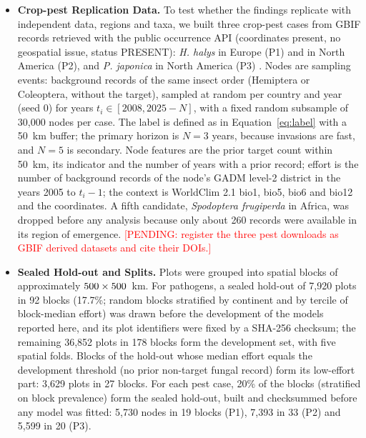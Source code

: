 \documentclass[a4paper,fleqn]{cas-sc}
\newcommand{\pending}[1]{\textcolor{red}{[PENDING: #1]}}
\begin{document}
\begin{itemize}[leftmargin=1.4em]
\item \textbf{Crop-pest Replication Data.} To test whether the findings replicate with independent data, regions and taxa, we built three crop-pest cases from GBIF records retrieved with the public occurrence API (coordinates present, no geospatial issue, status PRESENT): \textit{H. halys} in Europe (P1) and in North America (P2), and \textit{P. japonica} in North America (P3) \citep{leskey2018,althoff2022}. Nodes are sampling events: background records of the same insect order (Hemiptera or Coleoptera, without the target), sampled at random per country and year (seed 0) for years $t_i \in [2008, 2025-N]$, with a fixed random subsample of 30{,}000 nodes per case. The label is defined as in Equation~\eqref{eq:label} with a 50~km buffer; the primary horizon is $N = 3$ years, because invasions are fast, and $N = 5$ is secondary. Node features are the prior target count within 50~km, its indicator and the number of years with a prior record; effort is the number of background records of the node's GADM level-2 district in the years 2005 to $t_i - 1$; the context is WorldClim 2.1 bio1, bio5, bio6 and bio12 \citep{fick2017} and the coordinates. A fifth candidate, \textit{Spodoptera frugiperda} in Africa, was dropped before any analysis because only about 260 records were available in its region of emergence. \pending{register the three pest downloads as GBIF derived datasets and cite their DOIs.}

\item \textbf{Sealed Hold-out and Splits.} Plots were grouped into spatial blocks of approximately $500 \times 500$~km. For pathogens, a sealed hold-out of 7{,}920 plots in 92 blocks (17.7\%; random blocks stratified by continent and by tercile of block-median effort) was drawn before the development of the models reported here, and its plot identifiers were fixed by a SHA-256 checksum; the remaining 36{,}852 plots in 178 blocks form the development set, with five spatial folds. Blocks of the hold-out whose median effort equals the development threshold (no prior non-target fungal record) form its low-effort part: 3{,}629 plots in 27 blocks. For each pest case, 20\% of the blocks (stratified on block prevalence) form the sealed hold-out, built and checksummed before any model was fitted: 5{,}730 nodes in 19 blocks (P1), 7{,}393 in 33 (P2) and 5{,}599 in 20 (P3).

\end{itemize}

\end{document}

